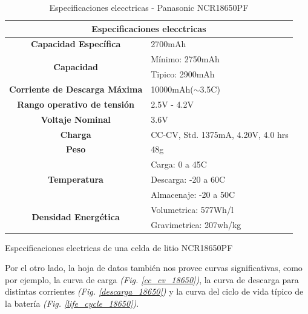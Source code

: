 \documentclass[10pt,a4paper]{article}
\begin{document}
\begin{table}[h]
    \begin{center}
	\begin{tabular}{|c|l|}
	    \hline
	    \multicolumn{2}{|c|}{Especificaciones elecctricas}                          \\ \hline
	    \textbf{Capacidad Específica}                 & 2700mAh                            \\ \hline
	    \multirow{2}{*}{\textbf{Capacidad}}           & Mínimo: 2750mAh                    \\ \cline{2-2} 
	    & Tipico: 2900mAh                    \\ \hline
	    \textbf{Corriente de Descarga Máxima}         & 10000mAh($\sim$3.5C)               \\ \hline
	    \textbf{Rango operativo de tensión}           & 2.5V - 4.2V                        \\ \hline
	    \textbf{Voltaje Nominal}                      & 3.6V                               \\ \hline
	    \textbf{Charga}                               & CC-CV, Std. 1375mA, 4.20V, 4.0 hrs \\ \hline
	    \textbf{Peso}                                 & 48g                              \\ \hline
	    \multirow{3}{*}{\textbf{Temperatura}}         & Carga: 0 a 45C                     \\ \cline{2-2} 
	    & Descarga: -20 a 60C                \\ \cline{2-2} 
	    & Almacenaje: -20 a 50C              \\ \hline
	    \multirow{2}{*}{\textbf{Densidad Energética}} & Volumetrica: 577Wh/l               \\ \cline{2-2} 
	    & Gravimetrica: 207wh/kg             \\ \hline
	\end{tabular}%
	\caption{Especificaciones electricas de una celda de litio NCR18650PF}
	\label{ncr_table}
    \end{center}
    \caption{Especificaciones elecctricas - Panasonic NCR18650PF}
    \label{table:ncr}
\end{table}

Por el otro lado, la hoja de datos también nos provee curvas significativas,
como por ejemplo, la curva de carga \emph{(Fig. \ref{cc_cv_18650})}, la curva de
descarga para distintas corrientes \emph{(Fig. \ref{descarga_18650})} y la curva
del ciclo de vida típico de la batería \emph{(Fig. \ref{life_cycle_18650})}.
\end{document}

